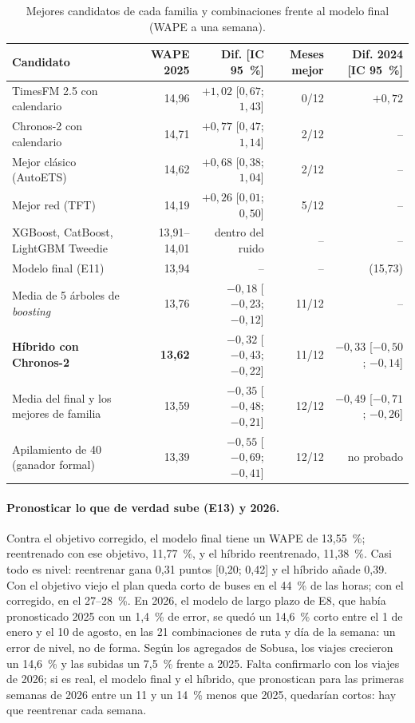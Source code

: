 \begin{table}[t]
  \centering\footnotesize
  \setlength{\tabcolsep}{2.4pt}
  \caption{Mejores candidatos de cada familia y combinaciones frente al modelo final (WAPE a una semana).}
  \label{tab:e12}
  \begin{tabular}{@{}l r r r r@{}}
    \toprule
    Candidato & WAPE 2025 & Dif. [IC 95~\%] & Meses mejor & Dif. 2024 [IC 95~\%] \\
    \midrule
    TimesFM 2.5 con calendario & 14,96 & $+1{,}02$ [$0{,}67$; $1{,}43$] & 0/12 & $+0{,}72$ \\
    Chronos-2 con calendario & 14,71 & $+0{,}77$ [$0{,}47$; $1{,}14$] & 2/12 & -- \\
    Mejor clásico (AutoETS) & 14,62 & $+0{,}68$ [$0{,}38$; $1{,}04$] & 2/12 & -- \\
    Mejor red (TFT) & 14,19 & $+0{,}26$ [$0{,}01$; $0{,}50$] & 5/12 & -- \\
    XGBoost, CatBoost, LightGBM Tweedie & 13,91--14,01 & dentro del ruido & -- & -- \\
    Modelo final (E11) & 13,94 & -- & -- & (15,73) \\
    Media de 5 árboles de \emph{boosting} & 13,76 & $-0{,}18$ [$-0{,}23$; $-0{,}12$] & 11/12 & -- \\
    \textbf{Híbrido con Chronos-2} & \textbf{13,62} & $-0{,}32$ [$-0{,}43$; $-0{,}22$] & 11/12 & $-0{,}33$ [$-0{,}50$; $-0{,}14$] \\
    Media del final y los mejores de familia & 13,59 & $-0{,}35$ [$-0{,}48$; $-0{,}21$] & 12/12 & $-0{,}49$ [$-0{,}71$; $-0{,}26$] \\
    Apilamiento de 40 (ganador formal) & 13,39 & $-0{,}55$ [$-0{,}69$; $-0{,}41$] & 12/12 & no probado \\
    \bottomrule
  \end{tabular}
\end{table}

\paragraph{Pronosticar lo que de verdad sube (E13) y 2026.} Contra el objetivo corregido, el modelo final tiene un WAPE
de 13,55~\%; reentrenado con ese objetivo, 11,77~\%, y el híbrido reentrenado, 11,38~\%. Casi todo es nivel: reentrenar
gana 0,31 puntos [0,20; 0,42] y el híbrido añade 0,39. Con el objetivo viejo el plan queda corto de buses en el 44~\% de
las horas; con el corregido, en el 27--28~\%. En 2026, el modelo de largo plazo de E8, que había pronosticado 2025 con un
1,4~\% de error, se quedó un 14,6~\% corto entre el 1 de enero y el 10 de agosto, en las 21 combinaciones de ruta y día
de la semana: un error de nivel, no de forma. Según los agregados de Sobusa, los viajes crecieron un 14,6~\% y las subidas
un 7,5~\% frente a 2025. Falta confirmarlo con los viajes de 2026; si es real, el modelo final y el híbrido, que
pronostican para las primeras semanas de 2026 entre un 11 y un 14~\% menos que 2025, quedarían cortos: hay que
reentrenar cada semana.

